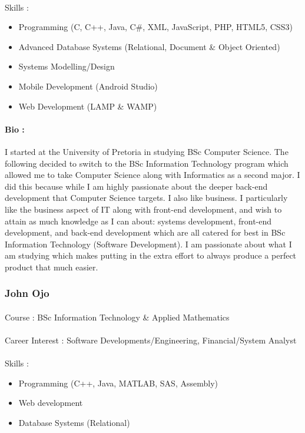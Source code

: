 \documentclass[11pt]{article}
\begin{document}
\paragraph{}Skills : 
\begin{itemize}
\item Programming (C, C++, Java, C\#, XML, JavaScript, PHP, HTML5, CSS3)
\item Advanced Database Systems (Relational, Document \& Object Oriented)
\item Systems Modelling/Design
\item Mobile Development (Android Studio)
\item Web Development (LAMP \& WAMP)
\end{itemize}
\paragraph{Bio :}I started at the University of Pretoria in studying BSc Computer Science. The following decided to switch to the BSc Information Technology program which allowed me to take Computer Science along with Informatics as a second major. I did this because while I am highly passionate about the deeper back-end development that Computer Science targets. I also like business. I particularly like the business aspect of IT along with front-end development, and wish to attain as much knowledge as I can about: systems development, front-end development, and back-end development which are all catered for best in BSc Information Technology (Software Development). I am passionate about what I am studying which makes putting in the extra effort to always produce a perfect product that much easier. 

\subsubsection{John Ojo}
\paragraph{}Course : BSc Information Technology \& Applied Mathematics
\paragraph{}Career Interest : Software Developments/Engineering, Financial/System Analyst
\paragraph{}Skills : 
\begin{itemize}
\item Programming (C++, Java, MATLAB, SAS, Assembly)
\item Web development
\item Database Systems (Relational)
\end{itemize}
\end{document}
